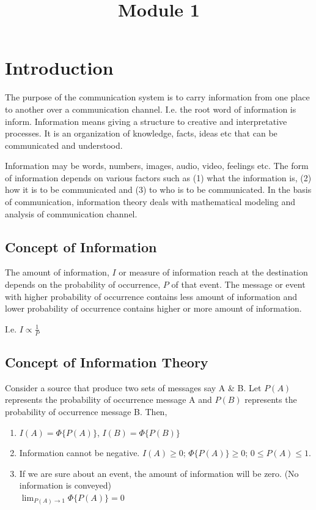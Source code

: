 \documentclass[12pt]{article}
\title{Module 1}
\begin{document}
\maketitle
\section{Introduction}
\linespread{1.5}
The purpose of the communication system is to carry information from one place to another over a communication channel. I.e. the root word of information is inform. Information means giving a structure to creative and interpretative processes. It is an organization of knowledge, facts, ideas etc that can be communicated and understood.

Information may be words, numbers, images, audio, video, feelings etc. The form of information depends on various factors such as (1) what the information is, (2) how it is to be communicated and (3) to who is to be communicated. In the basis of communication, information theory deals with mathematical modeling and analysis of communication channel.

\subsection{Concept of Information}
The amount of information, $I$ or measure of information reach at the destination depends on the probability of occurrence, $P$ of that event. The message or event with higher probability of occurrence contains less amount of information and lower probability of occurrence contains higher or more amount of information.

I.e. $I \propto \frac{1}{P}$

\subsection{Concept of Information Theory}
Consider a source that produce two sets of messages say A \& B. Let $P(A)$ represents the probability of occurrence message A and $P(B)$ represents the probability of occurrence message B. Then,

\begin{enumerate}
	\item $I(A)=\Phi\{P(A)\}$, $I(B)=\Phi\{P(B)\}$
	\item Information cannot be negative. $I(A)\ge0$; $\Phi\{P(A)\}\ge0$; $0\le P(A)\le1$.
	\item If we are sure about an event, the amount of information will be zero. (No information is conveyed)\\
	      $\lim_{P(A)\rightarrow1} \Phi\{P(A)\}=0$
\end{enumerate}
\end{document}

